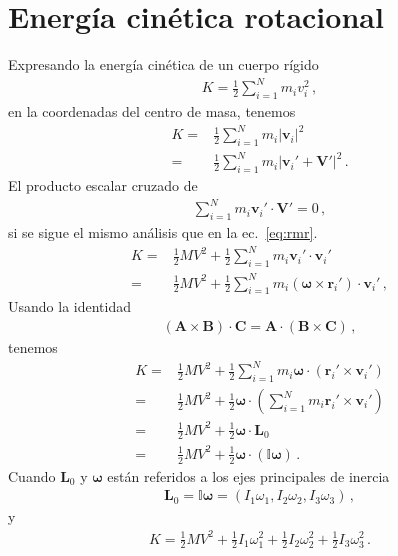 \section{Energía cinética rotacional}
Expresando la energía cinética de un cuerpo rígido 
\begin{align}
  K=\frac{1}{2}\sum_{i=1}^N m_i v_i^2\,,
\end{align}
en la coordenadas del centro de masa, tenemos
\begin{align}
  K=&\frac{1}{2}\sum_{i=1}^N m_i |\mathbf{v}_i|^2\nonumber\\
  =&\frac{1}{2}\sum_{i=1}^N m_i |\mathbf{v}_i'+\mathbf{V}'|^2\,.
\end{align}
El producto escalar cruzado de
\begin{align*}
  \sum_{i=1}^N m_i \mathbf{v}_i'\cdot\mathbf{V}'=0\,,
\end{align*}
si se sigue el mismo análisis que en la ec.~\eqref{eq:rmr}.
\begin{align*}
 K =&\frac{1}{2}M V^2+\frac{1}{2}\sum_{i=1}^N m_i \mathbf{v}_i'\cdot\mathbf{v}_i'\nonumber\\
 =&\frac{1}{2}M V^2+\frac{1}{2}\sum_{i=1}^N m_i (\boldsymbol{\omega}\times \mathbf{r}_i')\cdot\mathbf{v}_i'\,,
\end{align*}
Usando la identidad
\begin{align}
  (\mathbf{A}\times\mathbf{B})\cdot \mathbf{C}=\mathbf{A}\cdot(\mathbf{B}\times\mathbf{C})\,,
\end{align}
tenemos
\begin{align}
K =&\frac{1}{2}M V^2+\frac{1}{2}\sum_{i=1}^N m_i \boldsymbol{\omega}\cdot( \mathbf{r}_i'\times\mathbf{v}_i')\nonumber\\
=&\frac{1}{2}M V^2+\frac{1}{2}\boldsymbol{\omega}\cdot
\left(\sum_{i=1}^N m_i  \mathbf{r}_i'\times\mathbf{v}_i'\right)\nonumber\\
    =&\frac{1}{2}M V^2+\frac{1}{2}\boldsymbol{\omega}\cdot
  \mathbf{L}_0\nonumber\\
=&\frac{1}{2}M V^2+\frac{1}{2}\boldsymbol{\omega}\cdot
  \left(\mathbb{I}\boldsymbol{\omega}\right)\,.
\end{align}
Cuando $\mathbf{L}_0$ y $\boldsymbol{\omega}$ están referidos a los ejes principales de inercia
\begin{align}
  \mathbf{L}_0=\mathbb{I}\boldsymbol{\omega}=  \left(I_1\omega_1,I_2\omega_2,I_3\omega_3  \right)\,,
\end{align}
y
\begin{align}
  K=\frac{1}{2}MV^2+\frac{1}{2}I_1\omega_1^2+\frac{1}{2}I_2\omega_2^2+\frac{1}{2}I_3\omega_3^2\,.
\end{align}

